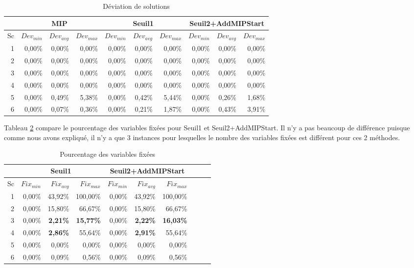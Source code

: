 \begin{table}[h]
    \centering
    \begin{tabular}{|r|r|r|r|r|r|r|r|r|r|}
    	\hline
    &	\multicolumn{3}{c|}{MIP} &\multicolumn{3}{c|}{Seuil1} & \multicolumn{3}{c|}{Seuil2+AddMIPStart}	\\ \hline
Sc & $Dev_{min}$ & $Dev_{avg}$	& $Dev_{max}$ & $Dev_{min}$ & $Dev_{avg}$	& $Dev_{max}$ & $Dev_{min}$ & $Dev_{avg}$	& $Dev_{max}$  \\ \hline
1&	0,00\%	&0,00\%	&0,00\%	&0,00\%	&0,00\%	&0,00\%	&0,00\%	&0,00\%	&0,00\%  \\ \hline
2&	0,00\%	&0,00\%	&0,00\%	&0,00\%	&0,00\%	&0,00\%	&0,00\%	&0,00\%	&0,00\%  \\ \hline
3&	0,00\%	&0,00\%	&0,00\%	&0,00\%	&0,00\%	&0,00\%	&0,00\%	&0,00\%	&0,00\% 	\\ \hline
4&	0,00\%	&0,00\%	&0,00\%	&0,00\%	&0,00\%	&0,00\%	&0,00\%	&0,00\%	&0,00\%  \\ \hline
5&	0,00\%	&0,49\%	&5,38\%	&0,00\%	&0,42\%	&5,44\%	&0,00\%	&0,26\%	&1,68\%  \\ \hline
6&	0,00\%	&0,07\%	&0,36\%	&0,00\%	&0,21\%	&1,87\%	&0,00\%	&0,43\%	&3,91\%  \\ \hline
    \end{tabular}
    \caption{Déviation de solutions}
    \label{tab_mip_s1_ams2_soldev}
\end{table}
\bigskip


Tableau \ref{tab_s1_ams2_fix} compare le pourcentage des variables fixées pour Seuil1 et Seuil2+AddMIPStart. Il n'y a pas beaucoup de différence puisque comme nous avons expliqué, il n'y a que 3 instances pour lesquelles le nombre des variables fixées est différent pour ces 2 méthodes.

\begin{table}[h]
    \centering
    \begin{tabular}{|r|r|r|r|r|r|r|r|r|r|}
    	\hline
   	&\multicolumn{3}{c|}{Seuil1} & \multicolumn{3}{c|}{Seuil2+AddMIPStart}	\\ \hline
Sc 	& $Fix_{min}$ & $Fix_{avg}$	& $Fix_{max}$   & $Fix_{min}$ & $Fix_{avg}$	& $Fix_{max}$             \\ \hline
1&  	0,00\%&	43,92\%&	100,00\%&  0,00\%&	43,92\%&	100,00\%\\ \hline
2& 	    0,00\%&	15,80\%&	66,67\%&  0,00\%&	15,80\%&	66,67\%   \\ \hline
3&  	0,00\%&	\textbf{2,21\%}&	\textbf{15,77\%}&  0,00\%&	\textbf{2,22\%}&	\textbf{16,03\%}    \\ \hline
4&		0,00\%&	\textbf{2,86\%}&	55,64\%&  0,00\%&	\textbf{2,91\%}&	55,64\% \\ \hline
5&		0,00\%&	0,00\%&	0,00\%&  0,00\%&	0,00\%&	0,00\%   \\ \hline
6&		0,00\%&	0,09\%&	0,56\%&  0,00\%&	0,09\%&	0,56\%    \\ \hline
    \end{tabular}
    \caption{Pourcentage des variables fixées}
    \label{tab_s1_ams2_fix}
\end{table}
